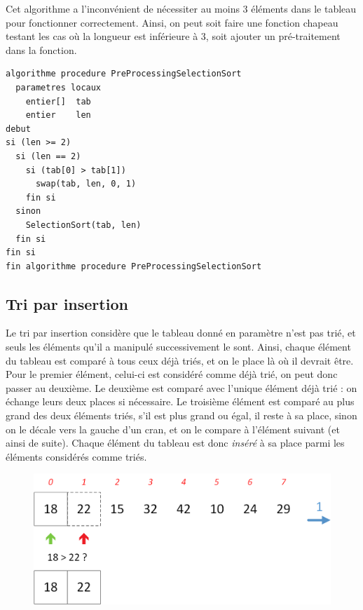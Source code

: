 \documentclass[11pt,a4paper]{article}
\begin{document}
Cet algorithme a l'inconvénient de nécessiter au moins 3 éléments dans le tableau pour fonctionner correctement.
Ainsi, on peut soit faire une fonction chapeau testant les cas où la longueur est inférieure à 3, soit ajouter un pré-traitement dans la fonction.

\begin{table}[ht!]
  \centering
\begin{lstlisting}[style=algorithmique]
algorithme procedure PreProcessingSelectionSort
  parametres locaux
    entier[]  tab
    entier    len
debut
si (len >= 2)
  si (len == 2)
    si (tab[0] > tab[1])
      swap(tab, len, 0, 1)
    fin si
  sinon
    SelectionSort(tab, len)
  fin si
fin si
fin algorithme procedure PreProcessingSelectionSort \end{lstlisting}
\end{table}


\newpage


\subsection{Tri par insertion}

Le tri par insertion considère que le tableau donné en paramètre n'est pas trié, et seuls les éléments qu'il a manipulé successivement le sont.
Ainsi, chaque élément du tableau est comparé à tous ceux déjà triés, et on le place là où il devrait être.
Pour le premier élément, celui-ci est considéré comme déjà trié, on peut donc passer au deuxième.
Le deuxième est comparé avec l'unique élément déjà trié : on échange leurs deux places si nécessaire.
Le troisième élément est comparé au plus grand des deux éléments triés, s'il est plus grand ou égal, il reste à sa place, sinon on le décale vers la gauche d'un cran, et on le compare à l'élément suivant (et ainsi de suite).
Chaque élément du tableau est donc \textit{inséré} à sa place parmi les éléments considérés comme triés.

\begin{figure}[ht!]
\centering
\centerline{
\includegraphics[scale=0.48]{img/InsertionSort_part1_1.png}
}
\end{figure}
\end{document}
